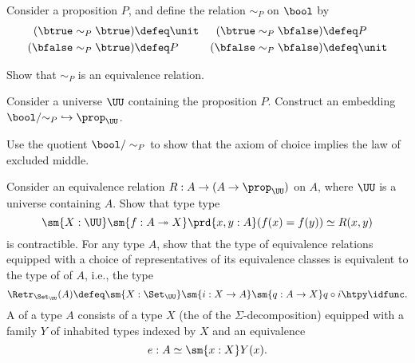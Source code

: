 \begin{exercises}
  \exitem Consider a proposition $P$, and define the relation $\sim_P$ on $\bool$ by
  \begin{align*}
    (\btrue\sim_P\btrue) & \defeq \unit & (\btrue\sim_P\bfalse) & \defeq P \\
    (\bfalse\sim_P\btrue) & \defeq P & (\bfalse\sim_P\bfalse) & \defeq \unit
  \end{align*}
  \begin{subexenum}
  \item  Show that $\sim_P$ is an equivalence relation.
  \item Consider a universe $\UU$ containing the proposition $P$. Construct an embedding ${\bool/{\sim}_P}\hookrightarrow\prop_\UU$.  
  \item Use the quotient $\bool/\sim_P$ to show that the axiom of choice implies the law of excluded middle.
  \end{subexenum}
  \exitem Consider an equivalence relation $R:A\to(A\to\prop_\UU)$ on $A$, where $\UU$ is a universe containing $A$. Show that type type
  \begin{equation*}
    \sm{X:\UU}\sm{f:A\twoheadrightarrow X}\prd{x,y:A}(f(x)=f(y))\simeq R(x,y)
  \end{equation*}
  is contractible.
  \exitem For any type $A$, show that the type of equivalence relations equipped with a choice of representatives of its equivalence classes is equivalent to the type of  of $A$, i.e., the type
  \begin{equation*}
    \Retr_{\Set_\UU}(A) \defeq \sm{X:\Set_\UU}\sm{i:X\to A}\sm{q:A\to X} q\circ i\htpy \idfunc.
  \end{equation*}
  \exitem  \label{ex:sigmadecompositions}A  of a type $A$ consists of a type $X$ (the  of the $\Sigma$-decomposition) equipped with a family $Y$ of inhabited types indexed by $X$ and an equivalence
  \begin{equation*}
    e:A\simeq \sm{x:X}Y(x).
  \end{equation*}

\end{exercises}

